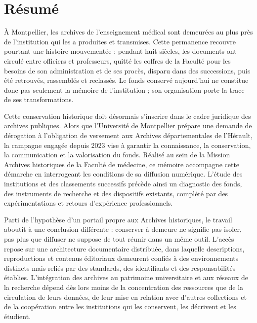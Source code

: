 
\chapter*{Résumé}

À Montpellier, les archives de l'enseignement médical sont demeurées au plus près de l'institution qui les a produites et transmises. Cette permanence recouvre pourtant une histoire mouvementée : pendant huit siècles, les documents ont circulé entre officiers et professeurs, quitté les coffres de la Faculté pour les besoins de son administration et de ses procès, disparu dans des successions, puis été retrouvés, rassemblés et reclassés. Le fonds conservé aujourd'hui ne constitue donc pas seulement la mémoire de l'institution ; son organisation porte la trace de ses transformations.

Cette conservation historique doit désormais s'inscrire dans le cadre juridique des archives publiques. Alors que l'Université de Montpellier prépare une demande de dérogation à l'obligation de versement aux Archives départementales de l'Hérault, la campagne engagée depuis 2023 vise à garantir la connaissance, la conservation, la communication et la valorisation du fonds. Réalisé au sein de la Mission Archives historiques de la Faculté de médecine, ce mémoire accompagne cette démarche en interrogeant les conditions de sa diffusion numérique. L'étude des institutions et des classements successifs précède ainsi un diagnostic des fonds, des instruments de recherche et des dispositifs existants, complété par des expérimentations et retours d'expérience professionnels.

Parti de l'hypothèse d'un portail propre aux Archives historiques, le travail aboutit à une conclusion différente : conserver à demeure ne signifie pas isoler, pas plus que diffuser ne suppose de tout réunir dans un même outil. L'accès repose sur une architecture documentaire distribuée, dans laquelle descriptions, reproductions et contenus éditoriaux demeurent confiés à des environnements distincts mais reliés par des standards, des identifiants et des responsabilités établies. L'intégration des archives au patrimoine universitaire et aux réseaux de la recherche dépend dès lors moins de la concentration des ressources que de la circulation de leurs données, de leur mise en relation avec d'autres collections et de la coopération entre les institutions qui les conservent, les décrivent et les étudient.

